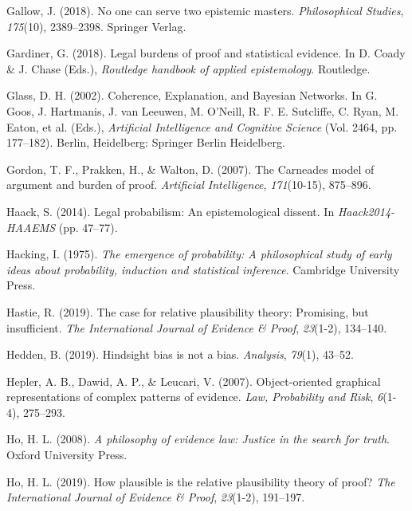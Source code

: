 \documentclass[11pt,dvipsnames,enabledeprecatedfontcommands]{scrartcl}
\begin{document}
\leavevmode\hypertarget{ref-Gallow2018No}{}%
Gallow, J. (2018). No one can serve two epistemic masters.
\emph{Philosophical Studies}, \emph{175}(10), 2389--2398. Springer
Verlag.

\leavevmode\hypertarget{ref-gardiner2018}{}%
Gardiner, G. (2018). Legal burdens of proof and statistical evidence. In
D. Coady \& J. Chase (Eds.), \emph{Routledge handbook of applied
epistemology}. Routledge.

\leavevmode\hypertarget{ref-glass2002}{}%
Glass, D. H. (2002). Coherence, Explanation, and Bayesian Networks. In
G. Goos, J. Hartmanis, J. van Leeuwen, M. O'Neill, R. F. E. Sutcliffe,
C. Ryan, M. Eaton, et al. (Eds.), \emph{Artificial Intelligence and
Cognitive Science} (Vol. 2464, pp. 177--182). Berlin, Heidelberg:
Springer Berlin Heidelberg.

\leavevmode\hypertarget{ref-gordon2007}{}%
Gordon, T. F., Prakken, H., \& Walton, D. (2007). The Carneades model of
argument and burden of proof. \emph{Artificial Intelligence},
\emph{171}(10-15), 875--896.

\leavevmode\hypertarget{ref-haack2011legal}{}%
Haack, S. (2014). Legal probabilism: An epistemological dissent. In
\emph{Haack2014-HAAEMS} (pp. 47--77).

\leavevmode\hypertarget{ref-Hacking1984}{}%
Hacking, I. (1975). \emph{The emergence of probability: A philosophical
study of early ideas about probability, induction and statistical
inference}. Cambridge University Press.

\leavevmode\hypertarget{ref-hastie2019CaseRelativePlausibilitya}{}%
Hastie, R. (2019). The case for relative plausibility theory: Promising,
but insufficient. \emph{The International Journal of Evidence \& Proof},
\emph{23}(1-2), 134--140.

\leavevmode\hypertarget{ref-hedden2019}{}%
Hedden, B. (2019). Hindsight bias is not a bias. \emph{Analysis},
\emph{79}(1), 43--52.

\leavevmode\hypertarget{ref-hepler2007ObjectorientedGraphicalRepresentations}{}%
Hepler, A. B., Dawid, A. P., \& Leucari, V. (2007). Object-oriented
graphical representations of complex patterns of evidence. \emph{Law,
Probability and Risk}, \emph{6}(1-4), 275--293.

\leavevmode\hypertarget{ref-ho2008philosophy}{}%
Ho, H. L. (2008). \emph{A philosophy of evidence law: Justice in the
search for truth}. Oxford University Press.

\leavevmode\hypertarget{ref-lai2019HowPlausibleRelative}{}%
Ho, H. L. (2019). How plausible is the relative plausibility theory of
proof? \emph{The International Journal of Evidence \& Proof},
\emph{23}(1-2), 191--197.
\end{document}

